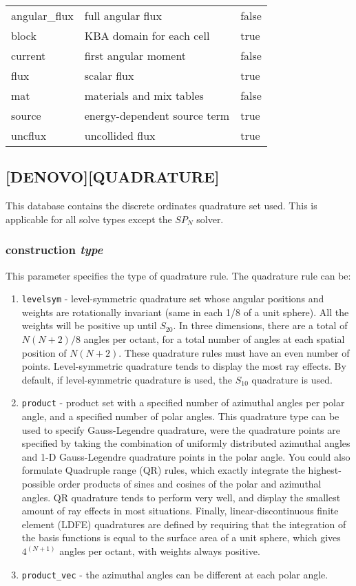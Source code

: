\documentclass[10pt]{article}
\begin{document}
\begin{tabular}{l l l}
angular\_flux & full angular flux & false\\
block & KBA domain for each cell & true\\
current & first angular moment & false\\
flux & scalar flux & true\\
mat & materials and mix tables & false\\
source & energy-dependent source term & true\\
uncflux & uncollided flux & true\\
\end{tabular}

\subsection{[DENOVO][QUADRATURE]}
This database contains the discrete ordinates quadrature set used. This is applicable for all solve types except the \(SP_N\) solver.

\subsubsection{construction \textit{type}}
This parameter specifies the type of quadrature rule. The quadrature rule can be:

\begin{enumerate}
\item \texttt{levelsym} - level-symmetric quadrature set whose angular positions and weights are rotationally invariant (same in each 1/8 of a unit sphere). All the weights will be positive up until \(S_{20}\). In three dimensions, there are a total of \(N(N+2)/8\) angles per octant, for a total number of angles at each spatial position of \(N(N+2)\). These quadrature rules must have an even number of points. Level-symmetric quadrature tends to display the most ray effects. By default, if level-symmetric quadrature is used, the \(S_{10}\) quadrature is used.
\item \texttt{product} - product set with a specified number of azimuthal angles per polar angle, and a specified number of polar angles. This quadrature type can be used to specify Gauss-Legendre quadrature, were the quadrature points are specified by taking the combination of uniformly distributed azimuthal angles and 1-D Gauss-Legendre quadrature points in the polar angle. You could also formulate Quadruple range (QR) rules, which exactly integrate the highest-possible order products of sines and cosines of the polar and azimuthal angles. QR quadrature tends to perform very well, and display the smallest amount of ray effects in most situations. Finally, linear-discontinuous finite element (LDFE) quadratures are defined by requiring that the integration of the basis functions is equal to the surface area of a unit sphere, which gives \(4^(N+1)\) angles per octant, with weights always positive.
\item \texttt{product\_vec} - the azimuthal angles can be different at each polar angle. 
\end{enumerate}
\end{document}
